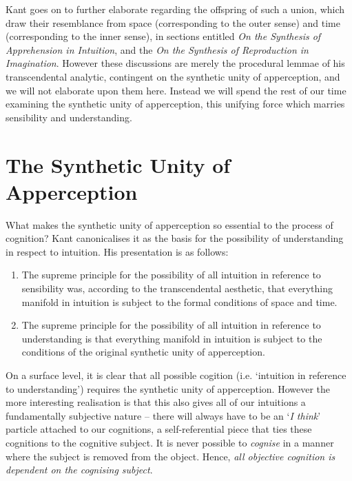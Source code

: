 \noindent
Kant goes on to further elaborate regarding the offspring of such a union, which draw their resemblance from space (corresponding to the outer sense) and time (corresponding to the inner sense), in sections entitled \emph{On the Synthesis of Apprehension in Intuition}, and the \emph{On the Synthesis of Reproduction in Imagination}. However these discussions are merely the procedural lemmae of his transcendental analytic, contingent on the synthetic unity of apperception, and we will not elaborate upon them here. Instead we will spend the rest of our time examining the synthetic unity of apperception, this unifying force which marries sensibility and understanding.

\section*{The Synthetic Unity of Apperception}
What makes the synthetic unity of apperception so essential to the process of cognition? Kant canonicalises it as the basis for the possibility of understanding in respect to intuition. His presentation is as follows:

\begin{enumerate}
  \item The supreme principle for the possibility of all intuition in reference to sensibility was, according to the transcendental aesthetic, that everything manifold in intuition is subject to the formal conditions of space and time.
  \item The supreme principle for the possibility of all intuition in reference to understanding is that everything manifold in intuition is subject to the conditions of the original synthetic unity of apperception.

  \autocite[B137]{hackett}
\end{enumerate}

\noindent
On a surface level, it is clear that all possible cogition (i.e. `intuition in reference to understanding') requires the synthetic unity of apperception. However the more interesting realisation is that this also gives all of our intuitions a fundamentally subjective nature -- there will always have to be an `\emph{I think}' particle attached to our cognitions, a self-referential piece that ties these cognitions to the cognitive subject. It is never possible to \emph{cognise} in a manner where the subject is removed from the object. Hence, \emph{all objective cognition is dependent on the cognising subject}.

